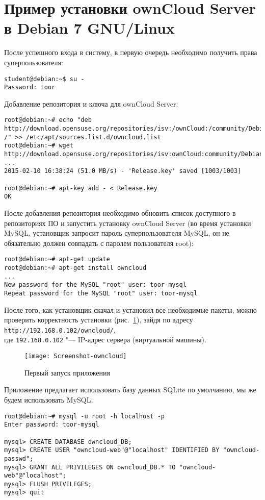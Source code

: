 \section{Пример установки ownCloud Server в Debian 7 GNU/Linux} \label{pril:c}

После успешного входа в систему, в первую очередь необходимо получить права суперпользователя:
\begin{lstlisting}
student@debian:~$ su -
Password: toor
\end{lstlisting}

Добавление репозитория и ключа для ownCloud Server:
\begin{lstlisting}
root@debian:~# echo "deb http://download.opensuse.org/repositories/isv:/ownCloud:/community/Debian_7.0/ /" >> /etc/apt/sources.list.d/owncloud.list
root@debian:~# wget http://download.opensuse.org/repositories/isv:ownCloud:community/Debian_7.0/Release.key
...
2015-02-10 16:38:24 (51.0 MB/s) - 'Release.key' saved [1003/1003]

root@debian:~# apt-key add - < Release.key
OK
\end{lstlisting}

После добавления репозитория необходимо обновить список доступного в репозиториях ПО и запустить установку ownCloud Server (во время установки MySQL, установщик запросит пароль суперпользователя MySQL, он не обязательно должен совпадать с паролем пользователя root):
\begin{lstlisting}
root@debian:~# apt-get update
root@debian:~# apt-get install owncloud
...
New password for the MySQL "root" user: toor-mysql
Repeat password for the MySQL "root" user: toor-mysql
\end{lstlisting}

После того, как установщик скачал и установил все необходимые пакеты, можно проверить корректность установки (рис.~\ref{pic:first-own}), зайдя по адресу \texttt{http://192.168.0.102/owncloud/}, \\
где \texttt{192.168.0.102} "--- IP-адрес сервера (виртуальной машины).

\begin{figure}[ht]
    \centering
	\texttt{[image: Screenshot-owncloud]}
	\caption{Первый запуск приложения}\label{pic:first-own}
\end{figure}

Приложение предлагает использовать базу данных SQLite по умолчанию, мы же будем использовать MySQL:
\begin{lstlisting}
root@debian:~# mysql -u root -h localhost -p
Enter password: toor-mysql

mysql> CREATE DATABASE owncloud_DB;
mysql> CREATE USER "owncloud-web"@"localhost" IDENTIFIED BY "owncloud-passwd";
mysql> GRANT ALL PRIVILEGES ON owncloud_DB.* TO "owncloud-web"@"localhost";
mysql> FLUSH PRIVILEGES;
mysql> quit
\end{lstlisting}

